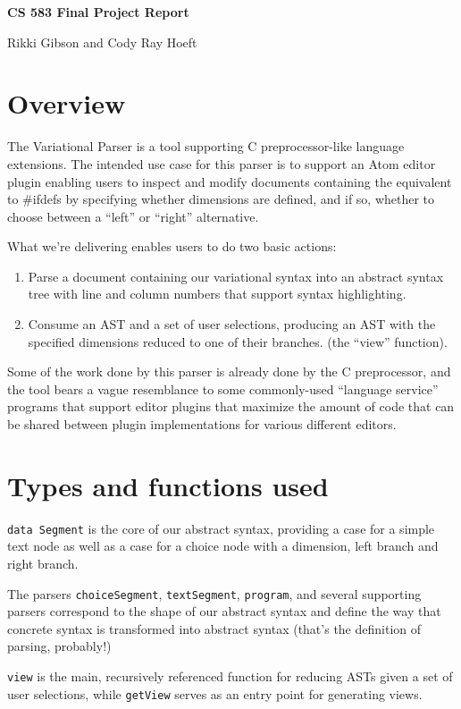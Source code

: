 \documentclass[11pt]{article}
\begin{document}
\Large\textbf{CS 583 Final Project Report}

\large{Rikki Gibson and Cody Ray Hoeft}
\normalsize
\section{Overview}
The Variational Parser is a tool supporting C preprocessor-like language extensions. The intended use case for this parser is to support an Atom editor plugin enabling users to inspect and modify documents containing the equivalent to \#ifdefs by specifying whether dimensions are defined, and if so, whether to choose between a ``left'' or ``right'' alternative.

What we're delivering enables users to do two basic actions:

\begin{enumerate} 
\item Parse a document containing our variational syntax into an abstract syntax tree with line and column numbers that support syntax highlighting.
\item Consume an AST and a set of user selections, producing an AST with the specified dimensions reduced to one of their branches. (the ``view'' function).
\end{enumerate}
Some of the work done by this parser is already done by the C preprocessor, and the tool bears a vague resemblance to some commonly-used ``language service'' programs that support editor plugins that maximize the amount of code that can be shared between plugin implementations for various different editors.

\section{Types and functions used}
\texttt{data Segment} is the core of our abstract syntax, providing a case for a simple text node as well as a case for a choice node with a dimension, left branch and right branch.

The parsers \texttt{choiceSegment}, \texttt{textSegment}, \texttt{program}, and several supporting parsers correspond to the shape of our abstract syntax and define the way that concrete syntax is transformed into abstract syntax (that's the definition of parsing, probably!)

\texttt{view} is the main, recursively referenced function for reducing ASTs given a set of user selections, while \texttt{getView} serves as an entry point for generating views.
\end{document}
